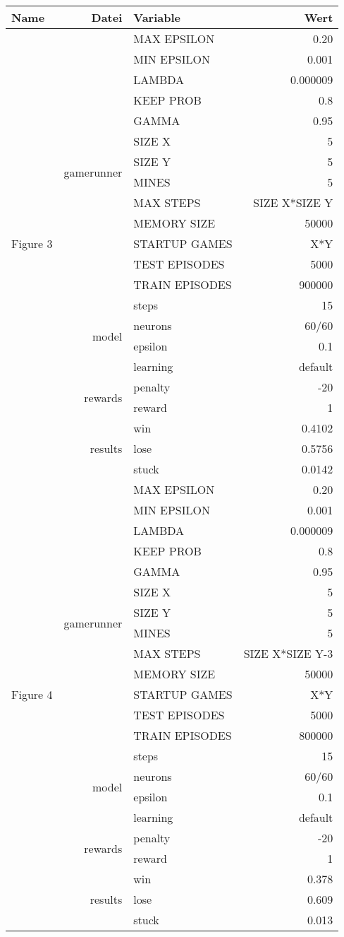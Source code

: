 \documentclass{article}
\begin{document}
\begin{tabularx}{\textwidth}{l|r|X|r}
	Name & Datei & Variable & Wert\\
\hline
\multirow{21}{*}{Figure 3} & \multirow{14}{*}{gamerunner} & MAX EPSILON	& 0.20\\
& & MIN EPSILON	& 0.001 \\
& & LAMBDA & 0.000009 \\
& & KEEP PROB & 0.8 \\
& & GAMMA	& 0.95 \\
& & SIZE X & 5 \\
& & SIZE Y & 5 \\
& & MINES & 5 \\
& & MAX STEPS & SIZE X*SIZE Y\\
& & MEMORY SIZE & 50000 \\
& & STARTUP GAMES & X*Y \\
& & TEST EPISODES & 5000 \\
& & TRAIN EPISODES & 900000 \\
& & steps & 15\\\cline{2-4}
& \multirow{2}{*}{model} & neurons & 60/60 \\ 
& & epsilon & 0.1\\
& & learning & default \\\cline{2-4}
& \multirow{2}{*}{rewards} & penalty	&-20\\
& & reward& 1\\\cline{2-4}
& \multirow{3}{*}{results} & win & 0.4102\\
& & lose & 0.5756\\
& & stuck & 0.0142\\
\hline
\hline
\multirow{21}{*}{Figure 4} & \multirow{14}{*}{gamerunner} & MAX EPSILON	& 0.20\\
& & MIN EPSILON	& 0.001 \\
& & LAMBDA & 0.000009 \\
& & KEEP PROB & 0.8 \\
& & GAMMA	& 0.95 \\
& & SIZE X & 5 \\
& & SIZE Y & 5 \\
& & MINES & 5 \\
& & MAX STEPS & SIZE X*SIZE Y-3\\
& & MEMORY SIZE & 50000 \\
& & STARTUP GAMES & X*Y \\
& & TEST EPISODES & 5000 \\
& & TRAIN EPISODES & 800000 \\
& & steps & 15\\\cline{2-4}
& \multirow{2}{*}{model} & neurons & 60/60 \\ 
& & epsilon & 0.1\\
& & learning & default \\\cline{2-4}
& \multirow{2}{*}{rewards} & penalty	&-20\\
& & reward& 1\\\cline{2-4}
& \multirow{3}{*}{results} & win & 0.378\\
& & lose & 0.609\\
& & stuck & 0.013\\
\hline
\end{tabularx}
\end{document}
